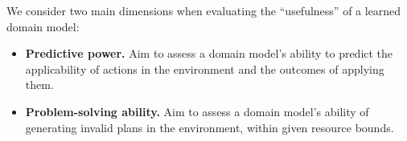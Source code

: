 \documentclass[letterpaper]{article} %
\newif\ifaddcomments
\newcommand{\roni}[1]{\ifaddcomments{\textcolor{red}{[Roni: #1]}}\fi}
\newcommand{\mauro}[1]{\ifaddcomments{\textcolor{green}{[Mauro: #1]}}\fi}
\newcommand{\gregor}[1]{\ifaddcomments{\textcolor{orange}{[Gregor: #1]}}\fi}
\begin{document}
We consider two main dimensions when evaluating the ``usefulness'' of a learned domain model: 
%
\begin{itemize}
    \item \textbf{Predictive power.} Aim to assess a domain model's ability to predict the applicability of actions in the environment and the outcomes of applying them. 
    \item \textbf{Problem-solving ability.} Aim to assess a domain model's ability of generating invalid plans in the environment, within given resource bounds. %
\end{itemize}
\end{document}
